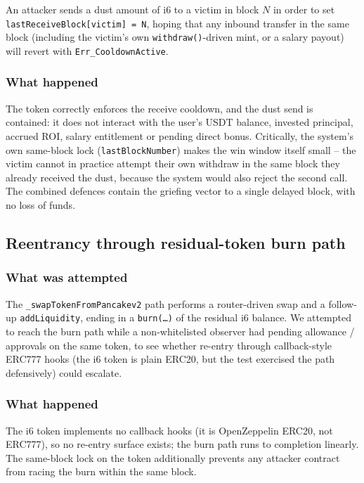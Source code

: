 \documentclass[11pt,a4paper]{article}
\begin{document}
An attacker sends a dust amount of i6 to a victim in block \(N\) in order
to set \texttt{lastReceiveBlock[victim] = N}, hoping that any inbound
transfer in the same block (including the victim's own
\texttt{withdraw()}-driven mint, or a salary payout) will revert with
\texttt{Err\_CooldownActive}.

\subsubsection*{What happened}

The token correctly enforces the receive cooldown, and the dust send is
contained: it does not interact with the user's USDT balance, invested
principal, accrued ROI, salary entitlement or pending direct bonus.
Critically, the system's own same-block lock (\texttt{lastBlockNumber})
makes the win window itself small -- the victim cannot in practice attempt
their own withdraw in the same block they already received the dust,
because the system would also reject the second call. The combined
defences contain the griefing vector to a single delayed block, with no
loss of funds.

\subsection{Reentrancy through residual-token burn path}

\subsubsection*{What was attempted}

The \texttt{\_swapTokenFromPancakev2} path performs a router-driven swap
and a follow-up \texttt{addLiquidity}, ending in a \texttt{burn(\dots)} of
the residual i6 balance. We attempted to reach the burn path while a
non-whitelisted observer had pending allowance / approvals on the same
token, to see whether re-entry through callback-style ERC777 hooks (the
i6 token is plain ERC20, but the test exercised the path defensively)
could escalate.

\subsubsection*{What happened}

The i6 token implements no callback hooks (it is OpenZeppelin ERC20, not
ERC777), so no re-entry surface exists; the burn path runs to completion
linearly. The same-block lock on the token additionally prevents any
attacker contract from racing the burn within the same block.
\end{document}
